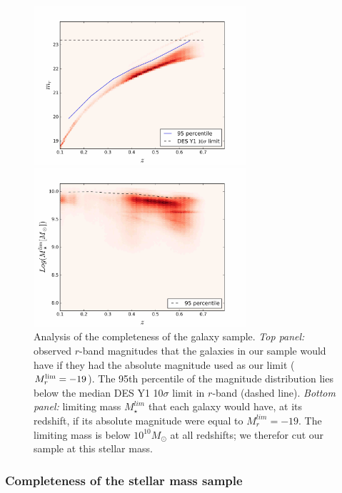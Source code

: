 \begin{figure}\centering
 \includegraphics[width=0.7\textwidth]{./chapters/chapter5/figs/r_completeness.jpg}

\includegraphics[width=0.7\textwidth]{./chapters/chapter5/figs/mass_completeness.jpg}\caption{Analysis of the completeness of the galaxy sample. \emph{Top panel:} observed $r$-band magnitudes that the galaxies in our sample would have if they had the absolute magnitude used as our limit ($M_r^{\rm lim} =-19$). The  95th percentile of the magnitude distribution lies below the median DES Y1 10$\sigma$ limit in $r$-band (dashed line).
\emph{Bottom panel:} limiting mass $M_\star^{lim}$ that each galaxy would have, at its redshift, if its absolute magnitude were equal to $M_r^{lim} =-19$. The limiting mass is below $10^{10}M_\odot$ at all redshifts; we therefor cut our sample at this stellar mass.}\label{compl}\end{figure}

\subsubsection{Completeness of the stellar mass sample}

